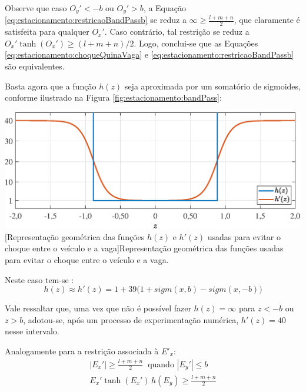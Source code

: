 Observe que caso $ O_y' < -b$ ou $O_y' > b $, a Equação  \eqref{eq:estacionamento:restricaoBandPassb} se reduz a $ \infty \geq \frac{l + m + n}{2} $, que claramente é satisfeita para qualquer $ O_x' $. Caso contrário, tal restrição se reduz a $ O_x' \tanh(O_x') \geq (l + m + n)/2 $. Logo, conclui-se que as Equações \eqref{eq:estacionamento:choqueQuinaVaga} e \eqref{eq:estacionamento:restricaoBandPassb} são equivalentes. 

Basta agora que a função $ h(z) $ seja aproximada por um somatório de sigmoides, conforme ilustrado na Figura \ref{fig:estacionamento:bandPass}:

\noindent	
\begin{minipage}{\textwidth}
	\vspace{\onelineskip}
	\centering
	\includegraphics[scale=0.58]{fig/resultados/estacionamento/obs/apxBandPass}
	[Representação geométrica das funções $ h(z) $ e $ h'(z) $ usadas para evitar o choque entre o veículo e a vaga]{Representação geométrica das funções usadas para evitar o choque entre o veículo e a vaga.}
	\label{fig:estacionamento:bandPass}
	\vspace{\onelineskip}
\end{minipage}

Neste caso tem-se \cite{li_time-optimal_2016}:
%
\begin{equation}
	h(z) \approx h'(z) = 1 + 39 \big(1 + sigm(x, b) - sigm(x, -b)\big)
\end{equation}

Vale ressaltar que, uma vez que não é possível fazer $ h(z) = \infty $ para $ z < -b $ ou $ z > b $, adotou-se, após um processo de experimentação numérica, $ h'(z) = 40 $ nesse intervalo. 

Analogamente para a restrição associada à $ E'_x $: 
%
\begin{gather}
|E_x'| \geq \frac{l + m + n}{2} \;\; \text{quando } |E_y'| \leq b  \\
E_x' \tanh(E_x') \, h(E_y) \geq \frac{l + m + n}{2}
\end{gather}

